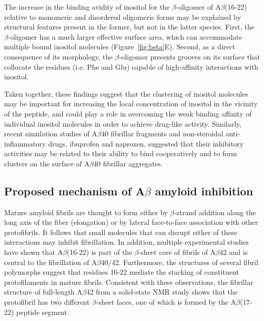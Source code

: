 The increase in the binding avidity of inositol for the $\beta$-oligomer of A$\beta$(16-22) relative to monomeric and disordered oligomeric forms may be explained by structural features present in the former, but not in the latter species. First, the $\beta$-oligomer has a much larger effective surface area, which can accommodate multiple bound inositol molecules (Figure~{\ref{fig:beta}}E). Second, as a direct consequence of its morphology,  the $\beta$-oligomer presents grooves on its surface that collocate the residues (i.e. Phe and Glu) capable of high-affinity interactions with inositol. 

Taken together, these findings suggest that the clustering of inositol molecules may be important for increasing the local concentration of inositol in the vicinity of the peptide, and could play a role in overcoming the weak binding affinity of individual inositol molecules in order to achieve drug-like activity. Similarly, recent simulation studies of A$\beta$40 fibrillar fragments and non-steroidal anti-inflammatory drugs, ibuprofen and naproxen, suggested that their inhibitory activities may be related to their ability to bind cooperatively and to form clusters on the surface of A$\beta$40 fibrillar aggregates.\cite{Takeda:2010p34,Raman:2009p47}


\subsection{Proposed mechanism of A$\beta$ amyloid inhibition}
Mature amyloid fibrils are thought to form either by $\beta$-strand addition along the long axis of the fiber (elongation) or by lateral face-to-face association with other protofibrils.\cite{Straub:2011p174} It follows that small molecules that can disrupt either of these interactions may inhibit fibrillation. In addition, multiple experimental studies have shown that A$\beta$(16-22) is part of the $\beta$-sheet core of fibrils of A$\beta$42\cite{Hilbich:1992vy,Gordon:2001tj,Watanabe:2002ti,Inouye:1993ku,Paravastu:2009fi} and is central to the fibrillation of A$\beta$40/42.\cite{Cukalevski:2012ks, deGroot:2006p4453} 
Furthermore, the structures of several fibril polymorphs suggest that residues 16-22 mediate the stacking of constituent protofilaments in mature fibrils.\cite{Petkova:2002p192,Luhrs:2005p229,Paravastu:2009fi,Wu:2010p3553} Consistent with these observations, the fibrillar structure of full-length A$\beta$42 from a solid-state NMR study shows that the protofibril has two different $\beta$-sheet faces, one of which is formed by the A$\beta$(17-22) peptide segment.\cite{Luhrs:2005p229}

